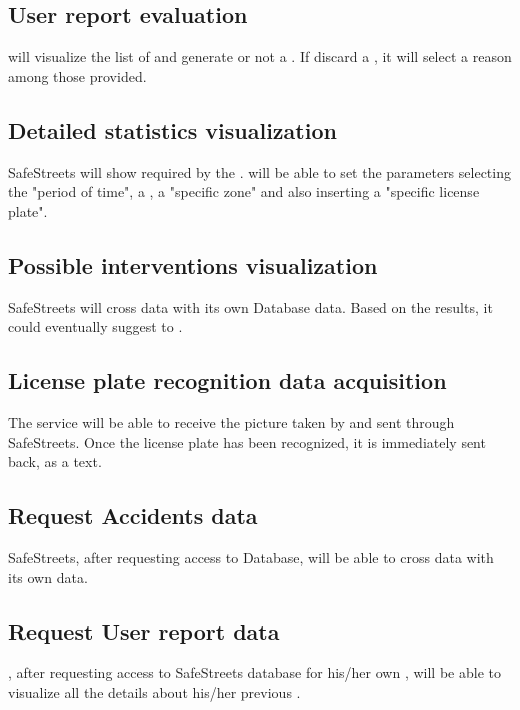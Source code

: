 \documentclass[../../RASD.tex]{subfiles}
\begin{document}
	\subsection{User report evaluation}
	 will visualize the list of  and generate or not a . If  discard a , it will select a reason among those provided.
	
	\subsection{Detailed statistics visualization}
	SafeStreets will show  required by the .  will be able to set the parameters selecting the "period of time", a , a "specific zone" and also inserting a "specific license plate". 
	
	\subsection{Possible interventions visualization}
	SafeStreets will cross   data with its own Database data. Based on the results, it could eventually suggest  to . 
	
	\subsection{License plate recognition data acquisition}
	The service will be able to receive the picture taken by  and sent through SafeStreets. Once the license plate has been recognized, it is immediately sent back, as a text.
	
	\subsection{Request Accidents data}
	SafeStreets, after requesting access to   Database, will be able to cross  data with its own data. 
	
	\subsection{Request User report data}
	, after requesting access to SafeStreets database for his/her own , will be able to visualize all the details about his/her previous . 
	
\end{document}

